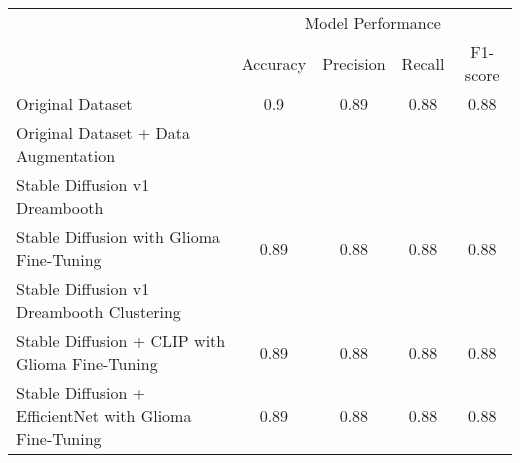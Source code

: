 \begin{table}[H]
\centering
\begin{tabular}{lcccc}
\toprule
\multirow{2}{*}{} & \multicolumn{4}{c}{Model Performance} \\
\cmidrule(lr){2-5}
  & Accuracy & Precision & Recall & F1-score \\
\midrule
Original Dataset & 0.9 & 0.89 & 0.88 & 0.88 \\
\midrule
Original Dataset + Data Augmentation &  &  &  &  \\
\midrule
Stable Diffusion v1 Dreambooth& \\
Stable Diffusion with Glioma Fine-Tuning & 0.89 & 0.88 & 0.88 & 0.88 \\
\midrule
Stable Diffusion v1 Dreambooth Clustering & \\
Stable Diffusion + CLIP with Glioma  Fine-Tuning & 0.89 & 0.88 & 0.88 & 0.88 \\
Stable Diffusion + EfficientNet with Glioma  Fine-Tuning & 0.89 & 0.88 & 0.88 & 0.88 \\
\bottomrule
\end{tabular}
\caption{}
\label{tab:brain_results_comparison}
\end{table}
